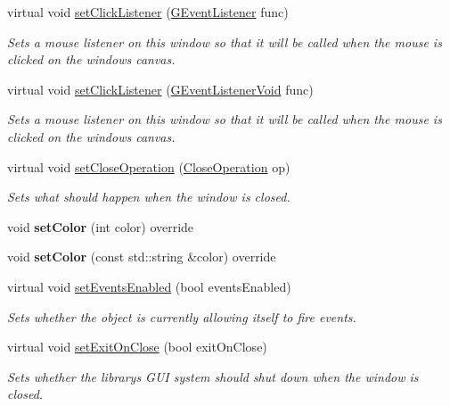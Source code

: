 \begin{DoxyCompactItemize}
virtual void \mbox{\hyperlink{classsgl_1_1GWindow_abd40af6921242584d0954f173911b190}{set\+Click\+Listener}} (\mbox{\hyperlink{namespacesgl_ae9f3e9eab70035da1a2b114e21357b25}{G\+Event\+Listener}} func)
\begin{DoxyCompactList}\small\item\em Sets a mouse listener on this window so that it will be called when the mouse is clicked on the window\textquotesingle{}s canvas. \end{DoxyCompactList}\item 
virtual void \mbox{\hyperlink{classsgl_1_1GWindow_a856414c92df90f56f3877475eb3f8fc4}{set\+Click\+Listener}} (\mbox{\hyperlink{namespacesgl_a54427ce97bb1c2804e4fe2b0a62e8b17}{G\+Event\+Listener\+Void}} func)
\begin{DoxyCompactList}\small\item\em Sets a mouse listener on this window so that it will be called when the mouse is clicked on the window\textquotesingle{}s canvas. \end{DoxyCompactList}\item 
virtual void \mbox{\hyperlink{classsgl_1_1GWindow_a8163e9440d0fb801a63ae9b3c90d5969}{set\+Close\+Operation}} (\mbox{\hyperlink{classsgl_1_1GWindow_a84803201f0f9569db61f51cac9e0d2d2}{Close\+Operation}} op)
\begin{DoxyCompactList}\small\item\em Sets what should happen when the window is closed. \end{DoxyCompactList}\item 
void {\bfseries set\+Color} (int color) override
\item 
void {\bfseries set\+Color} (const std\+::string \&color) override
\item 
virtual void \mbox{\hyperlink{classsgl_1_1GObservable_afaa30b2a9e0f378fd1c70d2f1d0b8216}{set\+Events\+Enabled}} (bool events\+Enabled)
\begin{DoxyCompactList}\small\item\em Sets whether the object is currently allowing itself to fire events. \end{DoxyCompactList}\item 
virtual void \mbox{\hyperlink{classsgl_1_1GWindow_abad01a63e29c19aee274af1b36209838}{set\+Exit\+On\+Close}} (bool exit\+On\+Close)
\begin{DoxyCompactList}\small\item\em Sets whether the library\textquotesingle{}s G\+UI system should shut down when the window is closed. \end{DoxyCompactList}\item 

\end{DoxyCompactItemize}
